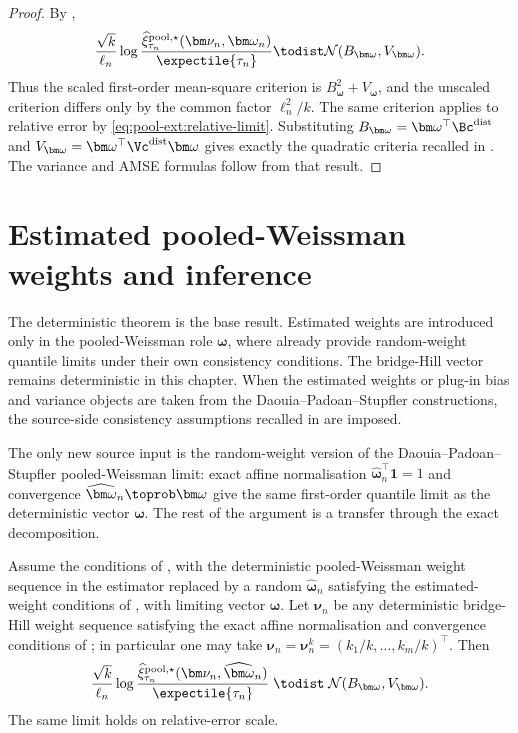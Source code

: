 \begin{proof}
By ,
\[
  \frac{\sqrt{k}}{\ell_n}
  \log
  \frac{
    \widehat\xi_{\tau_n}^{\mathrm{pool},\star}(\bm\nu_n,\bm\omega_n)
  }{\expectile{\tau_n}}
  \todist
  \mathcal N(B_{\bm\omega},V_{\bm\omega}).
\]
Thus the scaled first-order mean-square criterion is
\(B_{\bm\omega}^2+V_{\bm\omega}\), and the unscaled criterion differs only by
the common factor \(\ell_n^2/k\). The same criterion applies to relative error
by \eqref{eq:pool-ext:relative-limit}. Substituting
\(B_{\bm\omega}=\bm\omega^\top\Bc^{\mathrm{dist}}\) and
\(V_{\bm\omega}=\bm\omega^\top\Vc^{\mathrm{dist}}\bm\omega\) gives exactly the
quadratic criteria recalled in . The variance
and AMSE formulas follow from that result.
\end{proof}

\section{Estimated pooled-Weissman weights and inference}
\label{sec:pool-ext:inference}

The deterministic theorem is the base result. Estimated weights are introduced
only in the pooled-Weissman role \(\bm\omega\), where
\textcite{DaouiaPadoanStupfler2021} already provide random-weight quantile
limits under their own consistency conditions. The bridge-Hill vector remains
deterministic in this chapter.
When the estimated weights or plug-in bias and variance objects are taken from
the Daouia--Padoan--Stupfler constructions, the source-side consistency
assumptions recalled in  are imposed.

The only new source input is the random-weight version of the
Daouia--Padoan--Stupfler pooled-Weissman limit: exact affine normalisation
\(\widehat{\bm\omega}_n^\top\bm 1=1\) and convergence
\(\widehat{\bm\omega}_n\toprob\bm\omega\) give the same first-order quantile
limit as the deterministic vector \(\bm\omega\). The rest of the argument is a
transfer through the exact decomposition.

\begin{corollary}
\label{cor:pool-ext:estimated-omega}
Assume the conditions of , with the
deterministic pooled-Weissman weight sequence in the estimator replaced by a
random \(\widehat{\bm\omega}_n\) satisfying the estimated-weight conditions of
, with limiting vector
\(\bm\omega\). Let \(\bm\nu_n\) be any deterministic bridge-Hill weight
sequence satisfying the exact affine normalisation and convergence conditions
of ; in particular one may take
\(\bm\nu_n=\bm\nu_n^k=(k_1/k,\ldots,k_m/k)^\top\). Then
\[
  \frac{\sqrt{k}}{\ell_n}
  \log
  \frac{
    \widehat\xi_{\tau_n}^{\mathrm{pool},\star}
    (\bm\nu_n,\widehat{\bm\omega}_n)
  }{\expectile{\tau_n}}
  \;\todist\;
  \mathcal N(B_{\bm\omega},V_{\bm\omega}).
\]
The same limit holds on relative-error scale.
\end{corollary}

